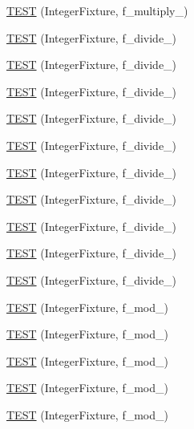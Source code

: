 \begin{DoxyCompactItemize}
\item 
\hyperlink{TestInteger_8c_09_09_a4286276c9dc9c6908a7783d1ab8fb67f}{T\-E\-S\-T} (Integer\-Fixture, f\-\_\-multiply\-\_)
\item 
\hyperlink{TestInteger_8c_09_09_a81da8f394ef78dd20bd9f76746d17858}{T\-E\-S\-T} (Integer\-Fixture, f\-\_\-divide\-\_)
\item 
\hyperlink{TestInteger_8c_09_09_a52406787b21c9201f1d72223895386ae}{T\-E\-S\-T} (Integer\-Fixture, f\-\_\-divide\-\_)
\item 
\hyperlink{TestInteger_8c_09_09_a9e847df31f5de88b6766d7550a916e1a}{T\-E\-S\-T} (Integer\-Fixture, f\-\_\-divide\-\_)
\item 
\hyperlink{TestInteger_8c_09_09_a5379c16d66de9a99f31148b022fd5e2a}{T\-E\-S\-T} (Integer\-Fixture, f\-\_\-divide\-\_)
\item 
\hyperlink{TestInteger_8c_09_09_aafaf249532835d59c375635d925b43ab}{T\-E\-S\-T} (Integer\-Fixture, f\-\_\-divide\-\_)
\item 
\hyperlink{TestInteger_8c_09_09_a02df82b4884a5be95a48c6fa553d72a0}{T\-E\-S\-T} (Integer\-Fixture, f\-\_\-divide\-\_)
\item 
\hyperlink{TestInteger_8c_09_09_acf45a7a9d694d24c985b0353801d8a61}{T\-E\-S\-T} (Integer\-Fixture, f\-\_\-divide\-\_)
\item 
\hyperlink{TestInteger_8c_09_09_ad9887f6d24d65196b8d5f6777060ad37}{T\-E\-S\-T} (Integer\-Fixture, f\-\_\-divide\-\_)
\item 
\hyperlink{TestInteger_8c_09_09_a5b0559eb343740553c6f9a17d9884b84}{T\-E\-S\-T} (Integer\-Fixture, f\-\_\-divide\-\_)
\item 
\hyperlink{TestInteger_8c_09_09_a0ca6f67e52ffadc981b5320ab944bc3e}{T\-E\-S\-T} (Integer\-Fixture, f\-\_\-divide\-\_)
\item 
\hyperlink{TestInteger_8c_09_09_ad1c18471fe759f4b650ac03788d95b21}{T\-E\-S\-T} (Integer\-Fixture, f\-\_\-mod\-\_)
\item 
\hyperlink{TestInteger_8c_09_09_ada3ec8b05801545e392c2d436ffca830}{T\-E\-S\-T} (Integer\-Fixture, f\-\_\-mod\-\_)
\item 
\hyperlink{TestInteger_8c_09_09_ab07059c9569d6a6d07cbf2445e51bbc5}{T\-E\-S\-T} (Integer\-Fixture, f\-\_\-mod\-\_)
\item 
\hyperlink{TestInteger_8c_09_09_afc8a179775a7711fb0248c1ed0642c7b}{T\-E\-S\-T} (Integer\-Fixture, f\-\_\-mod\-\_)
\item 
\hyperlink{TestInteger_8c_09_09_aad30bd573a51d22f6dc0f82a0bb51f75}{T\-E\-S\-T} (Integer\-Fixture, f\-\_\-mod\-\_)

\end{DoxyCompactItemize}
